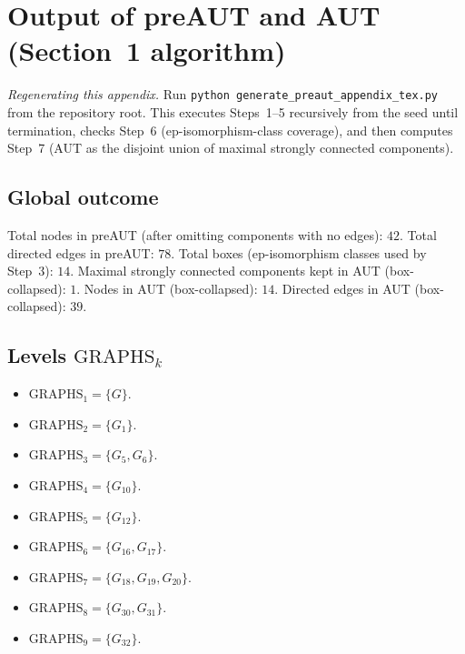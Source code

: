 \section[Output of preAUT and AUT (Section 1)]{Output of preAUT and AUT (Section~1 algorithm)}

\noindent\textit{Regenerating this appendix.} Run \texttt{python generate\_preaut\_appendix\_tex.py} from the repository root. This executes Steps~1--5 recursively from the seed until termination, checks Step~6 (ep-isomorphism-class coverage), and then computes Step~7 (AUT as the disjoint union of maximal strongly connected components).

\subsection*{Global outcome}
Total nodes in preAUT (after omitting components with no edges): $42$. Total directed edges in preAUT: $78$. Total boxes (ep-isomorphism classes used by Step~3): $14$. Maximal strongly connected components kept in AUT (box-collapsed): $1$. Nodes in AUT (box-collapsed): $14$. Directed edges in AUT (box-collapsed): $39$.

\subsection*{Levels $\mathrm{GRAPHS}_{k}$}
\begin{itemize}[leftmargin=*]
\item $\mathrm{GRAPHS}_{1}=\{G\}$.
\item $\mathrm{GRAPHS}_{2}=\{G_{1}\}$.
\item $\mathrm{GRAPHS}_{3}=\{G_{5}, G_{6}\}$.
\item $\mathrm{GRAPHS}_{4}=\{G_{10}\}$.
\item $\mathrm{GRAPHS}_{5}=\{G_{12}\}$.
\item $\mathrm{GRAPHS}_{6}=\{G_{16}, G_{17}\}$.
\item $\mathrm{GRAPHS}_{7}=\{G_{18}, G_{19}, G_{20}\}$.
\item $\mathrm{GRAPHS}_{8}=\{G_{30}, G_{31}\}$.
\item $\mathrm{GRAPHS}_{9}=\{G_{32}\}$.
\end{itemize}

